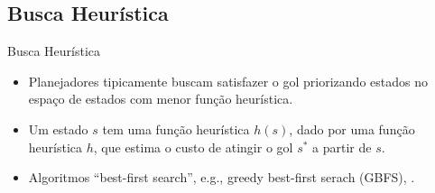 \documentclass{beamer}
\begin{document}
\subsection{Busca Heurística}
\begin{frame}{Busca Heurística}
\begin{itemize}
  \item Planejadores tipicamente buscam satisfazer o gol \alert{priorizando} estados no espaço de estados com \alert{menor função heurística}.
  \pause
  \item Um estado $s$ tem uma função heurística $h(s)$, dado por uma função heurística $h$, que estima o \alert{custo de atingir o gol $s^{*}$} a partir de $s$.
  \pause
  \item Algoritmos ``best-first search'', e.g., greedy best-first serach (GBFS), \astar.
\end{itemize}
\end{frame}
\end{document}
